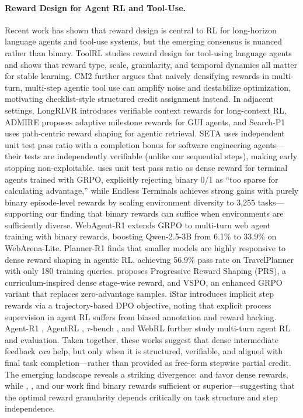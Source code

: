 \documentclass[11pt]{article}
\begin{document}
\paragraph{Reward Design for Agent RL and Tool-Use.}
Recent work has shown that reward design is central to RL for long-horizon language agents and tool-use systems, but the emerging consensus is nuanced rather than binary.
ToolRL \citep{toolrl2025} studies reward design for tool-using language agents and shows that reward type, scale, granularity, and temporal dynamics all matter for stable learning.
CM2 \citep{cm2_2025} further argues that naively densifying rewards in multi-turn, multi-step agentic tool use can amplify noise and destabilize optimization, motivating checklist-style structured credit assignment instead.
In adjacent settings, LongRLVR \citep{zhang2025longrlvr} introduces verifiable context rewards for long-context RL, ADMIRE \citep{admire2025} proposes adaptive milestone rewards for GUI agents, and Search-P1 \citep{searchp1} uses path-centric reward shaping for agentic retrieval.
SETA \citep{li2025seta} uses independent unit test pass ratio with a completion bonus for software engineering agents---their tests are independently verifiable (unlike our sequential steps), making early stopping non-exploitable.
\citet{seta2026} uses unit test pass ratio as dense reward for terminal agents trained with GRPO, explicitly rejecting binary 0/1 as ``too sparse for calculating advantage,'' while Endless Terminals \citep{gandhi2026endless} achieves strong gains with purely binary episode-level rewards by scaling environment diversity to 3,255 tasks---supporting our finding that binary rewards can suffice when environments are sufficiently diverse.
WebAgent-R1 \citep{wei2025webagent} extends GRPO to multi-turn web agent training with binary rewards, boosting Qwen-2.5-3B from 6.1\% to 33.9\% on WebArena-Lite.
Planner-R1 \citep{zhu2025planner} finds that smaller models are highly responsive to dense reward shaping in agentic RL, achieving 56.9\% pass rate on TravelPlanner with only 180 training queries.
\citet{su2025prs} proposes Progressive Reward Shaping (PRS), a curriculum-inspired dense stage-wise reward, and VSPO, an enhanced GRPO variant that replaces zero-advantage samples.
iStar \citep{liu2025istar} introduces implicit step rewards via a trajectory-based DPO objective, noting that explicit process supervision in agent RL suffers from biased annotation and reward hacking.
Agent-R1 \citep{agentr1}, AgentRL \citep{agentrl2025}, $\tau$-bench \citep{yao2024taubench}, and WebRL \citep{qi2024webrl} further study multi-turn agent RL and evaluation.
Taken together, these works suggest that dense intermediate feedback \emph{can} help, but only when it is structured, verifiable, and aligned with final task completion---rather than provided as free-form stepwise partial credit.
The emerging landscape reveals a striking divergence: \citet{seta2026} and \citet{zhu2025planner} favor dense rewards, while \citet{gandhi2026endless}, \citet{wei2025webagent}, and our work find binary rewards sufficient or superior---suggesting that the optimal reward granularity depends critically on task structure and step independence.
\end{document}
